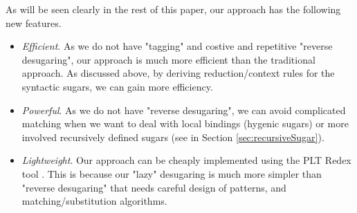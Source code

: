 As will be seen clearly in the rest of this paper, our approach has the following new features.
\begin{itemize}
  \item {\em Efficient}. As we do not have "tagging" and costive and repetitive "reverse desugaring", our approach is much more efficient than the traditional approach. As discussed above, by deriving reduction/context rules for the syntactic sugars, we can gain more efficiency.

  \item {\em Powerful}. As we do not have "reverse desugaring", we can avoid complicated matching when we want to deal with local bindings (hygenic sugars) or more involved recursively defined sugars (see  in Section \ref{sec:recursiveSugar}).

  \item {\em Lightweight}. Our approach can be cheaply implemented using the PLT Redex tool \cite{SEwPR}. This is because our "lazy" desugaring is much more simpler than "reverse desugaring" that needs careful design of patterns, and matching/substitution algorithms.

\end{itemize}
